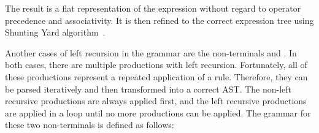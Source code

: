 The result is a flat representation of the expression without regard to operator precedence and associativity. It is then refined to the correct expression tree using Shunting Yard algorithm~\cite{algol60}.

Another cases of left recursion in the grammar are the non-terminals \nonterminal[MemberExpression]{}{} and \nonterminal[CallExpression]{}{}. In both cases, there are multiple productions with left recursion. Fortunately, all of these productions represent a repeated application of a rule. Therefore, they can be parsed iteratively and then transformed into a correct AST. The non-left recursive productions are always applied first, and the left recursive productions are applied in a loop until no more productions can be applied. The grammar for these two non-terminals is defined as follows:




